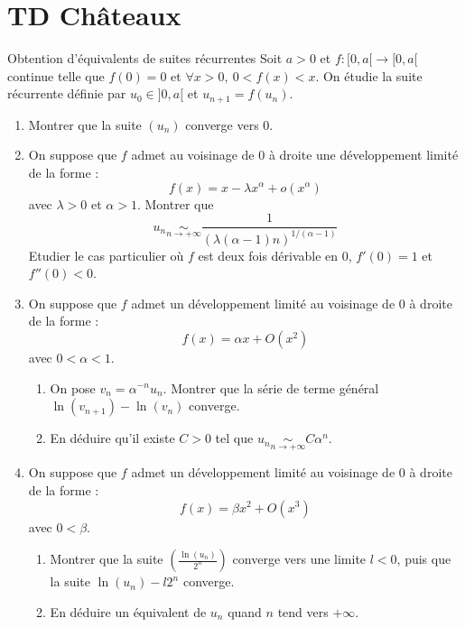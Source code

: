 \documentclass[french,a4paper]{article}
\theoremstyle{plain}
\theoremstyle{definition}
\theoremstyle{remark}
\begin{document}
\section{TD Châteaux}
\begin{ex}{Obtention d'équivalents de suites récurrentes}
	Soit $a>0$ et $f:[0,a[ \to[0,a[$ continue telle que $f(0)=0$ et $\forall x>0,\ 0<f(x)<x$. On étudie la suite récurrente définie par $u_0\in]0,a[$ et $u_{n+1}=f(u_n)$.
	\begin{enumerate}
		\item Montrer que la suite $(u_n)$ converge vers $0$.
		\item On suppose que $f$ admet au voisinage de $0$ à droite une développement limité de la forme : $$f(x)=x-\lambda x^\alpha+o(x^\alpha)$$ avec $\lambda>0$ et $\alpha>1$. Montrer que $$u_n\underset{n\to+\infty}{\sim}\frac{1}{\left(\lambda(\alpha-1)n\right)^{1/(\alpha-1)}}$$ Etudier le cas particulier où $f$ est deux fois dérivable en $0$, $f'(0)=1$ et $f''(0)<0$.
		\item On suppose que $f$ admet un développement limité au voisinage de $0$ à droite de la forme : $$f(x)=\alpha x+O(x^2)$$ avec $0<\alpha<1$.
		\begin{enumerate}[label=\alph*.]
			\item On pose $v_n=\alpha^{-n}u_n$. Montrer que la série de terme général $\ln(v_{n+1})-\ln(v_n)$ converge.
			\item En déduire qu'il existe $C>0$ tel que $\displaystyle u_n\underset{n\to+\infty}{\sim}C\alpha^n$.
		\end{enumerate}
		\item On suppose que $f$ admet un développement limité au voisinage de $0$ à droite de la forme : $$f(x)=\beta x^2+O(x^3)$$ avec $0<\beta$.
		\begin{enumerate}[label=\alph*.]
			\item Montrer que la suite $\displaystyle\left(\frac{\ln(u_n)}{2^n}\right)$ converge vers une limite $l<0$, puis que la suite $\ln(u_n)-l2^n$ converge.
			\item En déduire un équivalent de $u_n$ quand $n$ tend vers $+\infty$.
		\end{enumerate}
	\end{enumerate}
\end{ex}
\end{document}
